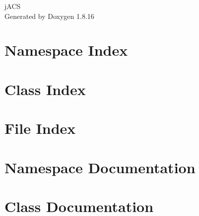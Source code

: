 \let\mypdfximage\pdfximage\def\pdfximage{\immediate\mypdfximage}\documentclass[twoside]{book}
\newcommand{\+}{\discretionary{\mbox{\scriptsize$\hookleftarrow$}}{}{}}
\newcommand{\clearemptydoublepage}{%
  \newpage{\pagestyle{empty}\cleardoublepage}%
}
\begin{document}
\hypersetup{pageanchor=false,
             bookmarksnumbered=true,
             pdfencoding=unicode
            }
\begin{titlepage}
\vspace*{7cm}
\begin{center}%
{\Large j\+A\+CS }\\
\vspace*{1cm}
{\large Generated by Doxygen 1.8.16}\\
\end{center}
\end{titlepage}
\clearemptydoublepage
{}
\tableofcontents
\clearemptydoublepage
{}
\hypersetup{pageanchor=true}

\chapter{Namespace Index}

\chapter{Class Index}

\chapter{File Index}

\chapter{Namespace Documentation}











\chapter{Class Documentation}

















\end{document}
